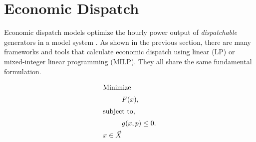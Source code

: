 \section{Economic Dispatch}

Economic dispatch models optimize the hourly power output of \textit{dispatchable} 
generators in a model system \cite{de_queiroz_repurposing_2019,neumann_near-optimal_2021}.
As shown in the previous section, there are many frameworks and tools that calculate 
economic dispatch using linear (LP) or mixed-integer linear programming (MILP). They all
share the same fundamental formulation.

\begin{align}
    \intertext{Minimize}
    &F(x),\\
    \intertext{subject to,}
    &g(x, p) \leq 0.\\
    x \in \vec{X}
\end{align}